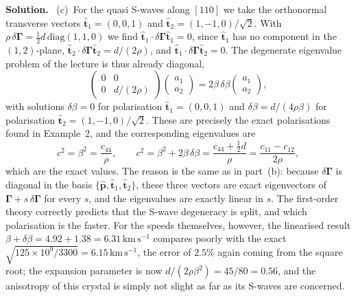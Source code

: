 \documentclass[a4paper,12pt]{paper}
\newenvironment{solution}{\par\noindent\textbf{Solution.}\ }{\par\medskip}
\begin{document}
\begin{solution}
(c)~For the quasi S-waves along $[110]$ we take the orthonormal transverse vectors
$\hat{\mathbf{t}}_{1}=(0,0,1)$ and $\hat{\mathbf{t}}_{2}=(1,-1,0)/\sqrt{2}$. With
$\rho\,\delta\bm{\Gamma}=\tfrac{1}{2}d\,\mathrm{diag}(1,1,0)$ we find
$\hat{\mathbf{t}}_{1}\cdot\delta\bm{\Gamma}\hat{\mathbf{t}}_{1}=0$, since $\hat{\mathbf{t}}_{1}$ has no component in the $(1,2)$-plane,
$\hat{\mathbf{t}}_{2}\cdot\delta\bm{\Gamma}\hat{\mathbf{t}}_{2}=d/(2\rho)$, and
$\hat{\mathbf{t}}_{1}\cdot\delta\bm{\Gamma}\hat{\mathbf{t}}_{2}=0$. The degenerate
eigenvalue problem of the lecture is thus already diagonal,
\begin{equation}
\begin{pmatrix}0&0\\0&d/(2\rho)\end{pmatrix}\begin{pmatrix}a_{1}\\a_{2}\end{pmatrix}
=2\beta\,\delta\beta\begin{pmatrix}a_{1}\\a_{2}\end{pmatrix},
\label{eq:28}
\end{equation}
with solutions $\delta\beta=0$ for polarisation $\hat{\mathbf{t}}_{1}=(0,0,1)$ and
$\delta\beta=d/(4\rho\beta)$ for polarisation $\hat{\mathbf{t}}_{2}=(1,-1,0)/\sqrt{2}$. These
are precisely the exact polarisations found in Example~2, and the corresponding eigenvalues are
\begin{equation}
c^{2}=\beta^{2}=\frac{c_{44}}{\rho},\qquad
c^{2}=\beta^{2}+2\beta\,\delta\beta=\frac{c_{44}+\tfrac{1}{2}d}{\rho}=\frac{c_{11}-c_{12}}{2\rho},
\label{eq:29}
\end{equation}
which are the exact values. The reason is the same as in part~(b): because
$\delta\bm{\Gamma}$ is diagonal in the basis $\{\hat{\mathbf{p}},\hat{\mathbf{t}}_{1},\hat{\mathbf{t}}_{2}\}$, these three vectors are exact eigenvectors of
$\bm{\Gamma}+s\,\delta\bm{\Gamma}$ for every $s$, and the eigenvalues are exactly linear in
$s$. The first-order theory correctly predicts that the S-wave degeneracy is split, and which
polarisation is the faster. For the speeds themselves, however, the linearised result
$\beta+\delta\beta=4.92+1.38=6.31\,\mathrm{km\,s^{-1}}$ compares poorly with the exact
$\sqrt{125\times10^{9}/3300}=6.15\,\mathrm{km\,s^{-1}}$, the error of $2.5\%$ again coming from
the square root; the expansion parameter is now $d/(2\rho\beta^{2})=45/80=0.56$, and the
anisotropy of this crystal is simply not slight as far as its S-waves are concerned.


\end{solution}
\end{document}
